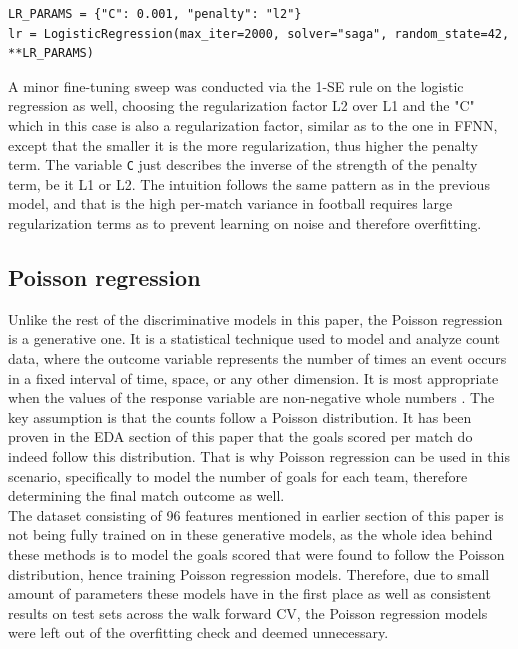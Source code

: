 \documentclass{article}
\begin{document}
\begin{lstlisting}[style=pythonstyle, caption={Logistic regression configuration}, label={lst:lr_config}]
LR_PARAMS = {"C": 0.001, "penalty": "l2"}
lr = LogisticRegression(max_iter=2000, solver="saga", random_state=42, **LR_PARAMS)

\end{lstlisting}
A minor fine-tuning sweep was conducted via the 1-SE rule on the logistic regression as well, choosing the regularization factor L2 over L1 and the "C" which in this case is also a regularization factor, similar as to the one in FFNN, except that the smaller it is the more regularization, thus higher the penalty term. The variable \texttt{C} just describes the inverse of the strength of the penalty term, be it L1 or L2. The intuition follows the same pattern as in the previous model, and that is the high per-match variance in football requires large regularization terms as to prevent learning on noise and therefore overfitting. 



\subsection{Poisson regression}
Unlike the rest of the discriminative models in this paper, the Poisson regression is a generative one. It is a statistical technique used to model and analyze count data, where the outcome variable represents the number of times an event occurs in a fixed interval of time, space, or any other dimension. It is most appropriate when the values of the response variable are non-negative whole numbers \cite{Poisson_regression}. The key assumption is that the counts follow a Poisson distribution. It has been proven in the EDA section of this paper that the goals scored per match do indeed follow this distribution. That is why Poisson regression can be used in this scenario, specifically to model the number of goals for each team, therefore determining the final match outcome as well. 
\\
The dataset consisting of 96 features mentioned in earlier section of this paper is not being fully trained on in these generative models, as the whole idea behind these methods is to model the goals scored that were found to follow the Poisson distribution, hence training Poisson regression models. Therefore, due to small amount of parameters these models have in the first place as well as consistent results on test sets across the walk forward CV, the Poisson regression models were left out of the overfitting check and deemed unnecessary.
\end{document}
